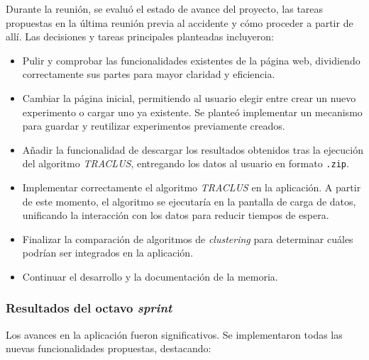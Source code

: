 Durante la reunión, se evaluó el estado de avance del proyecto, las tareas propuestas en la última reunión previa al accidente y cómo proceder a partir de allí. Las decisiones y tareas principales planteadas incluyeron:

\begin{itemize}
    \item Pulir y comprobar las funcionalidades existentes de la página web, dividiendo correctamente sus partes para mayor claridad y eficiencia.
    \item Cambiar la página inicial, permitiendo al usuario elegir entre crear un nuevo experimento o cargar uno ya existente. Se planteó implementar un mecanismo para guardar y reutilizar experimentos previamente creados.
    \item Añadir la funcionalidad de descargar los resultados obtenidos tras la ejecución del algoritmo \textit{TRACLUS}, entregando los datos al usuario en formato \texttt{.zip}.
    \item Implementar correctamente el algoritmo \textit{TRACLUS} en la aplicación. A partir de este momento, el algoritmo se ejecutaría en la pantalla de carga de datos, unificando la interacción con los datos para reducir tiempos de espera.
    \item Finalizar la comparación de algoritmos de \textit{clustering} para determinar cuáles podrían ser integrados en la aplicación.
    \item Continuar el desarrollo y la documentación de la memoria.
\end{itemize}

\subsubsection{Resultados del octavo \textit{sprint}}

Los avances en la aplicación fueron significativos. Se implementaron todas las nuevas funcionalidades propuestas, destacando:

